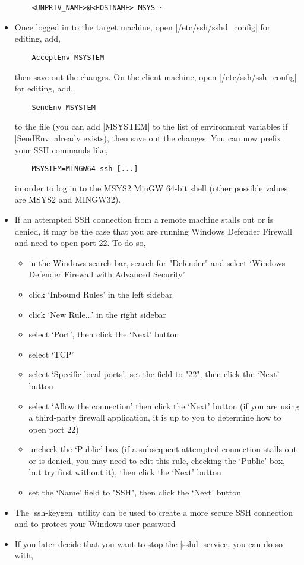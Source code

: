 \begin{itemize}
	\begin{lstlisting}
	<UNPRIV_NAME>@<HOSTNAME> MSYS ~
	\end{lstlisting}

	\item Once logged in to the target machine, open \lstinlinebg|/etc/ssh/sshd_config| for editing, add,

	\begin{lstlisting}
	AcceptEnv MSYSTEM
	\end{lstlisting}

	then save out the changes. On the client machine, open \lstinlinebg|/etc/ssh/ssh_config| for editing, add, 

	\begin{lstlisting}
	SendEnv MSYSTEM
	\end{lstlisting}

	to the file (you can add \lstinlinebg|MSYSTEM| to the list of environment variables if \lstinlinebg|SendEnv| already exists), then save out the changes. You can now prefix your SSH commands like, 

	\begin{lstlisting}
	MSYSTEM=MINGW64 ssh [...]
	\end{lstlisting}

	in order to log in to the MSYS2 MinGW 64-bit shell (other possible values are MSYS2 and MINGW32).
	\item If an attempted SSH connection from a remote machine stalls out or is denied, it may be the case that you are running Windows Defender Firewall and need to open port 22. To do so,
	\begin{itemize}
		\item in the Windows search bar, search for "Defender" and select `Windows Defender Firewall with Advanced Security'
		\item click `Inbound Rules' in the left sidebar
		\item click `New Rule...' in the right sidebar
		\item select `Port', then click the `Next' button
		\item select `TCP'
		\item select `Specific local ports', set the field to "22", then click the `Next' button
		\item select `Allow the connection' then click the `Next' button (if you are using a third-party firewall application, it is up to you to determine how to open port 22)
		\item uncheck the `Public' box (if a subsequent attempted connection stalls out or is denied, you may need to edit this rule, checking the `Public' box, but try first without it), then click the `Next' button
		\item set the `Name' field to "SSH", then click the `Next' button
	\end{itemize}
	\item The \lstinlinebg|ssh-keygen| utility can be used to create a more secure SSH connection and to protect your Windows user password
	\item If you later decide that you want to stop the \lstinlinebg|sshd| service, you can do so with, 


\end{itemize}
